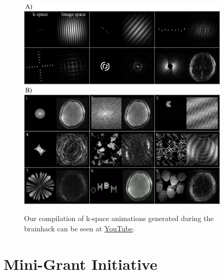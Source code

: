 \documentclass{article}
\begin{document}
\begin{figure}[h]
    \centering
    \includegraphics[width=0.9\textwidth]{images/k-particles.png}
    \label{fig:kparticles}
    \caption{
        Our compilation of k-space animations generated during the brainhack can be seen at \href{https://youtu.be/XS0LEQExGU8?si=I5Zufp3AcCbdhYIR}{YouTube}.
    }
\end{figure}



\section{Mini-Grant Initiative}
\end{document}
